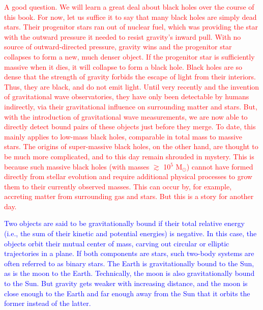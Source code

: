 \documentclass[main.tex]{subfiles}
\begin{document}
\begin{tcolorbox}[sharp corners, colback=red!30, colframe=red!80!blue, title=Black Holes$^{14}$]
\par \textcolor{red} {A good question.  We will learn a great deal about black holes over the course of this book.  For now, let us suffice it to say that many black holes are simply dead stars. Their progenitor stars ran out of nuclear fuel, which was providing the star with the outward pressure it needed to resist gravity's inward pull.  With no source of outward-directed pressure, gravity wins and the progenitor star collapses to form a new, much denser object.  If the progenitor star is sufficiently massive when it dies, it will collapse to form a black hole.  %
Black holes are so dense that the strength of gravity forbids the escape of light from their interiors.  Thus, they are black, and do not emit light.  Until very recently and the invention of gravitational wave observatories, they have only been detectable by humans indirectly, via their gravitational influence on surrounding matter and stars.  But, with the introduction of gravitational wave measurements, we are now able to directly detect bound pairs of these objects just before they merge.  To date, this mainly applies to low-mass black holes, comparable in total mass to massive stars.  The origins of super-massive black holes, on the other hand, are thought to be much more complicated, and to this day remain shrouded in mystery.  This is because such massive black holes (with masses $\gtrsim$ 10$^5$ M$_{\odot}$) cannot have formed directly from stellar evolution and require additional physical processes to grow them to their currently observed masses.  This can occur by, for example, accreting matter from surrounding gas and stars.  But this is a story for another day.}
\end{tcolorbox}

\begin{tcolorbox}[sharp corners, colback=blue!30, colframe=blue!80!blue, title=Gravitationally Bound Pairs of Objects and Binary Star Systems$^{15}$]
\par \textcolor{blue} {Two objects are said to be gravitationally bound if their total relative energy (i.e., the sum of their kinetic and potential energies) is negative.  In this case, the objects orbit their mutual center of mass, carving out circular or elliptic trajectories in a plane.  If both components are stars, such two-body systems are often referred to as binary stars.  The Earth is gravitationally bound to the Sun, as is the moon to the Earth.  Technically, the moon is also gravitationally bound to the Sun.  But gravity gets weaker with increasing distance, and the moon is close enough to the Earth and far enough away from the Sun that it orbits the former instead of the latter.}  
\end{tcolorbox}
\end{document}
